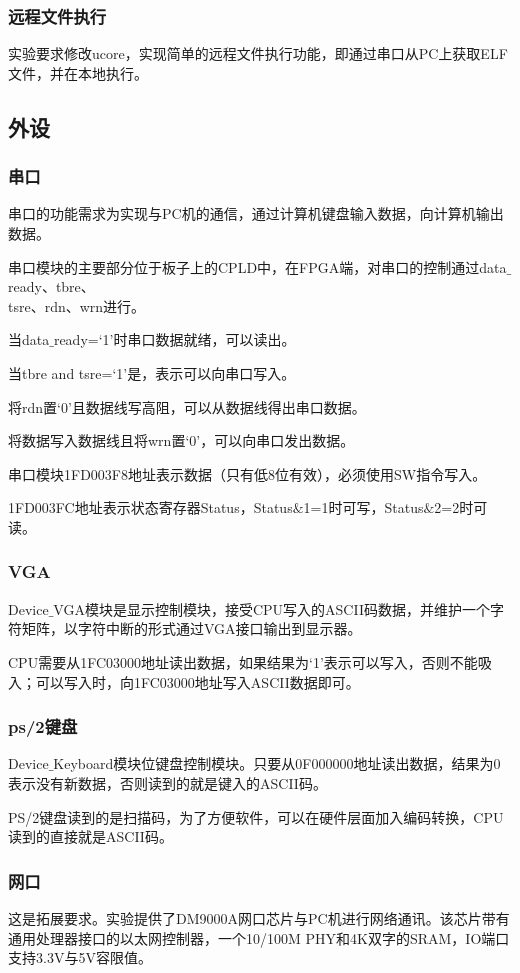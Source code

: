 \subsubsection{远程文件执行}
实验要求修改ucore，实现简单的远程文件执行功能，即通过串口从PC上获取ELF文件，并在本地执行。
\subsection{外设}
\subsubsection{串口}
串口的功能需求为实现与PC机的通信，通过计算机键盘输入数据，向计算机输出数据。

串口模块的主要部分位于板子上的CPLD中，在FPGA端，对串口的控制通过data$\_$ready、tbre、\\
tsre、rdn、wrn进行。

当data$\_$ready=‘1’时串口数据就绪，可以读出。

当tbre and tsre=‘1’是，表示可以向串口写入。

将rdn置‘0’且数据线写高阻，可以从数据线得出串口数据。

将数据写入数据线且将wrn置‘0’，可以向串口发出数据。

串口模块1FD003F8地址表示数据（只有低8位有效），必须使用SW指令写入。

1FD003FC地址表示状态寄存器Status，Status$\&$1=1时可写，Status$\&$2=2时可读。
\subsubsection{VGA}
Device$\_$VGA模块是显示控制模块，接受CPU写入的ASCII码数据，并维护一个字符矩阵，以字符中断的形式通过VGA接口输出到显示器。

CPU需要从1FC03000地址读出数据，如果结果为‘1’表示可以写入，否则不能吸入；可以写入时，向1FC03000地址写入ASCII数据即可。
\subsubsection{ps/2键盘}
Device$\_$Keyboard模块位键盘控制模块。只要从0F000000地址读出数据，结果为0表示没有新数据，否则读到的就是键入的ASCII码。

PS/2键盘读到的是扫描码，为了方便软件，可以在硬件层面加入编码转换，CPU读到的直接就是ASCII码。
\subsubsection{网口}
这是拓展要求。实验提供了DM9000A网口芯片与PC机进行网络通讯。该芯片带有通用处理器接口的以太网控制器，一个10/100M PHY和4K双字的SRAM，IO端口支持3.3V与5V容限值。

